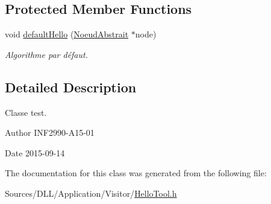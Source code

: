 \subsection*{Protected Member Functions}
\begin{DoxyCompactItemize}
\item 
\hypertarget{class_hello_tool_a78dcb5d555bac0cd9f87ac8ade27e711}{}void \hyperlink{class_hello_tool_a78dcb5d555bac0cd9f87ac8ade27e711}{default\+Hello} (\hyperlink{class_noeud_abstrait}{Noeud\+Abstrait} $\ast$node)\label{class_hello_tool_a78dcb5d555bac0cd9f87ac8ade27e711}

\begin{DoxyCompactList}\small\item\em Algorithme par défaut. \end{DoxyCompactList}\end{DoxyCompactItemize}


\subsection{Detailed Description}
Classe test. 

\begin{DoxyAuthor}{Author}
I\+N\+F2990-\/\+A15-\/01 
\end{DoxyAuthor}
\begin{DoxyDate}{Date}
2015-\/09-\/14 
\end{DoxyDate}


The documentation for this class was generated from the following file\+:\begin{DoxyCompactItemize}
\item 
Sources/\+D\+L\+L/\+Application/\+Visitor/\hyperlink{_hello_tool_8h}{Hello\+Tool.\+h}\end{DoxyCompactItemize}

